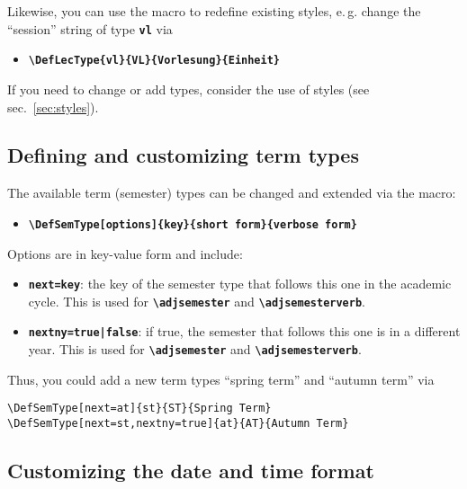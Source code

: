 \documentclass[english]{article}
\newcommand*\jmacro[1]{\textbf{\texttt{#1}}}
\newcommand*\jcsmacro[1]{\jmacro{\textbackslash{#1}}}
\newcommand*\joption[1]{\textbf{\texttt{#1}}}
\newcommand*\jparam[1]{\angus #1\angud}
\begin{document}
Likewise, you can use the macro to redefine existing styles, e.\,g. change
the ``session'' string of type \joption{vl} via
\begin{itemize}
\item \jcsmacro{DefLecType\{vl\}\{VL\}\{Vorlesung\}\{Einheit\}}
\end{itemize}
If you need to change or add types, consider the use of styles
(see sec.~\ref{sec:styles}).


\subsection{Defining and customizing term types}

The available term (semester) types can be changed and extended via the macro:
\begin{itemize}
\item \jcsmacro{DefSemType[\jparam{options}]\{\jparam{key}\}\{\jparam{short form}\}\{\jparam{verbose form}\}}
\end{itemize}
%
Options are in key-value form and include:
\begin{itemize}
	\item \joption{next=\jparam{key}}: the key of the semester type that follows this one in the academic cycle. This is
	      used for \jcsmacro{adjsemester} and \jcsmacro{adjsemesterverb}.
	\item \joption{nextny=\jparam{true|false}}: if true, the semester that follows this one is in a different year. This is
	      used for \jcsmacro{adjsemester} and \jcsmacro{adjsemesterverb}.
\end{itemize}
Thus, you could add a new term types ``spring term'' and ``autumn term'' via
\begin{lstlisting}[language={[LaTeX]TeX},basicstyle={\small\ttfamily},frame=single,moretexcs={[1]{DefSemType}}]
\DefSemType[next=at]{st}{ST}{Spring Term}
\DefSemType[next=st,nextny=true]{at}{AT}{Autumn Term}
\end{lstlisting}

\subsection{Customizing the date and time format}\label{sec:custdate}
\end{document}
